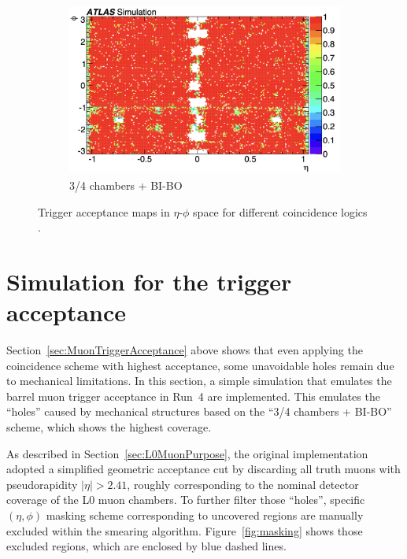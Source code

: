 \begin{figure}[htbp]

  \begin{subfigure}{0.70\textwidth}
    \includegraphics[width=\textwidth]{figs/chapter4/trigger_acceptance_map_3_4_BI_BO.png}
    \caption{3/4 chambers + BI-BO}
    \label{fig:trigger_acceptance_3_4_BI_BO}
  \end{subfigure}

  \caption{Trigger acceptance maps in $\eta$-$\phi$ space for different coincidence logics \cite{TDAQ_TDR}.}
  \label{fig:trigger_acceptance_all}
\end{figure}
\section{Simulation for the trigger acceptance} 
Section~\ref{sec:MuonTriggerAcceptance} above shows that even applying the coincidence scheme with highest acceptance, some unavoidable holes remain due to mechanical limitations. In this section, a simple simulation that emulates the barrel muon trigger acceptance in Run~4 are implemented. This emulates the ``holes'' caused by mechanical structures based on the ``3/4 chambers + BI-BO'' scheme, which shows the highest coverage.

As described in Section~\ref{sec:L0MuonPurpose}, the original implementation adopted a simplified geometric acceptance cut by discarding all truth muons with pseudorapidity $|\eta| > 2.41$, roughly corresponding to the nominal detector coverage of the L0 muon chambers. To further filter those ``holes'', specific $(\eta, \phi)$ masking scheme corresponding to uncovered regions are manually excluded within the smearing algorithm. Figure~\ref{fig:masking} shows those excluded regions, which are enclosed by blue dashed lines.

